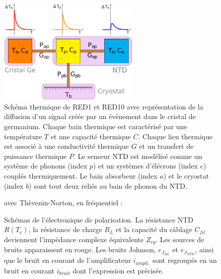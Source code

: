 \begin{figure}[!ht]
%	
\begin{center}
\includegraphics[width=0.6\textwidth]{Images/thermal_scheme.pdf}
\end{center}
\caption{Schéma thermique de RED1 et RED10 avec représentation de la diffusion d'un signal créée par un évènement dans le cristal de germanium. Chaque bain thermique est caractérisé par une température $T$ et une capacité thermique $C$. Chaque lien thermique est associé à une conductivité thermique $G$ et un transfert de puissance thermique $P$. Le senseur NTD est modélisé comme un système de phonons (index $p$) et un systèmes d'élécrons (index $e$) couplés thermiquement. Le bain absorbeur (index $a$) et  le cryostat (index $b$) sont tout deux reliés au bain de phonon du NTD. 
}
\label{thermal-scheme}
\end{figure}

\begin{figure}[!ht]
\begin{minipage}[c]{0.45\textwidth}
\resizebox{!}{\textwidth}{%
\begin{circuitikz}[scale=1]
	
\end{circuitikz}
}%
\end{minipage}
\hfill
\vrule{}
\hfill
\begin{minipage}[c]{0.45\textwidth}
\begin{center}
avec Thèvenin-Norton, en fréquentiel :
\end{center}
\resizebox{\textwidth}{!}{%
\begin{circuitikz}
	
\end{circuitikz}
}%
\end{minipage}
\caption{Schémas de l'électronique de polarisation. La résistance NTD $R(T_e)$, la résistance de charge $R_L$ et la capacité du câblage $C_{fil}$ deviennent l'impédance complexe équivalente $Z_{eq}$. Les sources de bruits apparaissent en rouge. Les bruits Johnson, $e_{J_{RL}}$ et $e_{J_{NTD}}$, ainsi que le bruit en courant de l'amplificateur $i_{ampli.}$ sont regroupés en un bruit en courant $i_{bruit}$ dont l'expression est précisée.}
\label{electric-scheme}
\end{figure}

